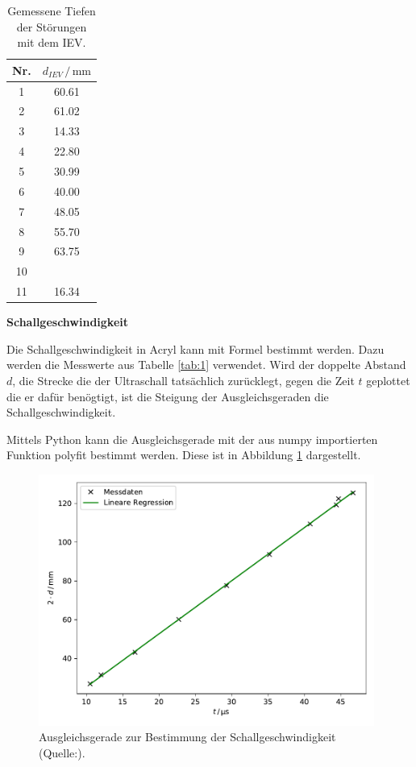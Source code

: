 \begin{table}
    \centering
    \caption{Gemessene Tiefen der Störungen mit dem IEV.}
    \begin{tabular}{c c}
        \toprule
        {Nr.} & {$d_{IEV} \, / \, \si{\milli\meter}$} \\
        \midrule
     1  & 60.61  \\
     2  & 61.02 \\
     3  & 14.33 \\
     4  & 22.80  \\
     5  & 30.99  \\
     6  & 40.00 \\
     7  & 48.05  \\
     8  & 55.70  \\
     9  & 63.75  \\    
     10 &       \\
     11 & 16.34 \\
        \bottomrule
    \end{tabular}
    \label{tab:2}
\end{table}

\noindent
\textbf{Schallgeschwindigkeit}

\noindent
Die Schallgeschwindigkeit in Acryl kann mit Formel %
bestimmt werden.
Dazu werden die Messwerte aus Tabelle \ref{tab:1} verwendet.
Wird der doppelte Abstand $d$, die Strecke die der Ultraschall tatsächlich zurücklegt,
gegen die Zeit $t$ geplottet die er dafür benögtigt, ist die Steigung der Ausgleichsgeraden
die Schallgeschwindigkeit.


\noindent
Mittels Python kann die Ausgleichsgerade mit der aus numpy \cite{numpy} importierten Funktion polyfit bestimmt werden.
Diese ist in Abbildung \ref{fig:schall} dargestellt.

\begin{figure}
    \centering
    \includegraphics[width=11cm]{Daten/schall.pdf}
    \caption{Ausgleichsgerade zur Bestimmung der Schallgeschwindigkeit (Quelle:\cite{US1}).}
    \label{fig:schall}
  \end{figure}
  
